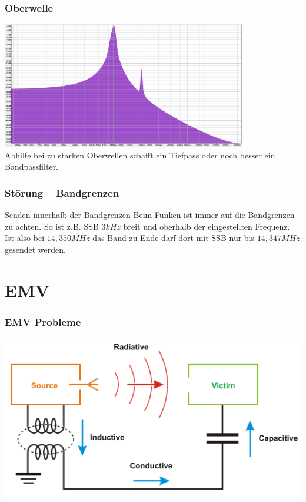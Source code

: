 \begin{frame}
  \frametitle{Oberwelle}
  \begin{center}
    \includegraphics[width=0.8\textwidth,height=.65\textheight,keepaspectratio]{a19/oberwelle.png}\\[2em]
    Abhilfe bei zu starken Oberwellen schafft ein Tiefpass oder noch besser ein Bandpassfilter.
  \end{center}
\end{frame}

\begin{frame}
  \frametitle{Störung -- Bandgrenzen}
  \begin{center}
    \begin{block}{Senden innerhalb der Bandgrenzen}
      Beim Funken ist immer auf die Bandgrenzen zu achten. So ist z.B. SSB $3kHz$ breit und oberhalb der eingestellten Frequenz. Ist also bei $14,350MHz$ das Band zu Ende darf dort mit SSB nur bis $14,347MHz$ gesendet werden.
    \end{block}
  \end{center}
\end{frame}

\section*{EMV}

\begin{frame}
  \frametitle{EMV Probleme}
  \begin{center}
    \includegraphics[width=1\textwidth,height=.85\textheight,keepaspectratio]{a19/EMI_coupling_modes.png}\\
    {\tiny \hyperlink{refs}{\cite{wm}}}
  \end{center}
\end{frame}

